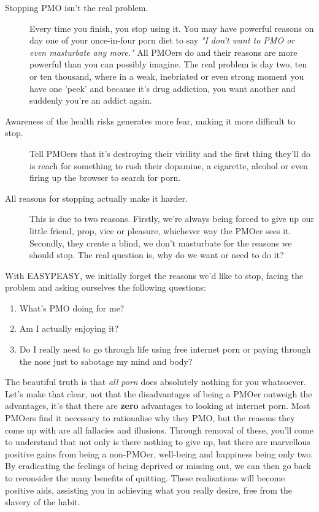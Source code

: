 \documentclass[easypeasy.tex]{subfiles}
\begin{document}
\begin{description}
  \item [Stopping PMO isn't the real problem.] Every time you finish, you stop using it. You may have powerful reasons on day one of your once-in-four porn diet to say \textit{"I don't want to PMO or even masturbate any more."} All PMOers do and their reasons are more powerful than you can possibly imagine. The real problem is day two, ten or ten thousand, where in a weak, inebriated or even strong moment you have one 'peek' and because it's drug addiction, you want another and suddenly you're an addict again.

\item [Awareness of the health risks generates more fear, making it more difficult to stop.] Tell PMOers that it's destroying their virility and the first thing they'll do is reach for something to rush their dopamine, a cigarette, alcohol or even firing up the browser to search for porn.

\item [All reasons for stopping actually make it harder.] This is due to two reasons. Firstly, we're always being forced to give up our little friend, prop, vice or pleasure, whichever way the PMOer sees it. Secondly, they create a blind, we don't masturbate for the reasons we should stop. The real question is, why do we want or need to do it?
\end{description}

With EASYPEASY, we initially forget the reasons we'd like to stop, facing the problem and asking ourselves the following questions:

\begin{enumerate}
\item What's PMO doing for me?
\item Am I actually enjoying it?
\item Do I really need to go through life using free internet porn or paying through the nose just to sabotage my mind and body?
\end{enumerate}

The beautiful truth is that \textit{all porn} does absolutely nothing for you whatsoever. Let's make that clear, not that the disadvantages of being a PMOer outweigh the advantages, it's that there are \textbf{zero} advantages to looking at internet porn. Most PMOers find it necessary to rationalise why they PMO, but the reasons they come up with are all fallacies and illusions. Through removal of these, you'll come to understand that not only is there nothing to give up, but there are marvellous positive gains from being a non-PMOer, well-being and happiness being only two. By eradicating the feelings of being deprived or missing out, we can then go back to reconsider the many benefits of quitting. These realisations will become positive aids, assisting you in achieving what you really desire, free from the slavery of the habit.
\end{document}
